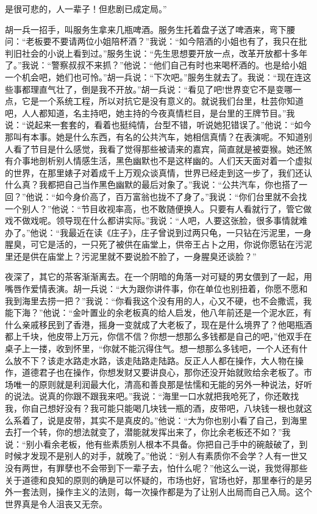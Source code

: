 \documentclass[12pt,oneside]{book}
\begin{document}
是很可悲的，人一辈子！但悲剧已成定局。''

胡一兵一招手，叫服务生拿来几瓶啤酒。服务生托着盘子送了啤酒来，弯下腰问：``老板要不要请两位小姐陪杯酒？''我说：``如今陪酒的小姐也有了，我只在批判旧社会的小说上看到过。''服务生说：``先生思想要开放一点，改革开放都十多年了。''我说：``警察叔叔不来抓？''他说：``他们自己有时也来喝杯酒的。也是给小姐一个机会吧，她们也可怜。''胡一兵说：``下次吧。''服务生就去了。我说：``现在连这些事都理直气壮了，倒是我不开放。''胡一兵说：``看见了吧!世界变它不是变哪一点，它是一个系统工程，所以对抗它是没有意义的。就说我们台里，杜芸你知道吧，人人都知道，名主持吧，她主持的今夜真情栏目，是台里的王牌节目。''我说：``说起来一套套的，看着也挺纯情，台型不错，听说她犯错误了。''他说：``如今那叫有本事。她是什么东西，有名的公共汽车，她相信真情？在表演呢。不知道别人看了节目是什么感觉，我看了觉得那些被请来的嘉宾，简直就是被耍猴。她还煞有介事地剖析别人情感生活，黑色幽默也不是这样幽的。人们天天面对着一个虚拟的世界，在那里婊子对着成千上万观众谈真情，世界已经走到这一步了，我们还认什么真？我都把自己当作黑色幽默的最后对象了。''我说：``公共汽车，你也搭了一回？''他说：``如今身价高了，百万富翁也拢不了身了。''我说：``你们台里就不会找一个别人？''他说：``节目收视率高，也不敢随便换人。只要有人看就行了，管它做戏不做戏呢。领导现在什么都讲实际。''我说：``人吧，人要这张脸，很多事情就难办了。''他说：``我最近在读《庄子》，庄子曾说到过两只龟，一只钻在污泥里，一身腥臭，可它是活的，一只死了被供在庙堂上，供帝王占卜之用，你说你愿钻在污泥里还是供在庙堂上？污泥里就不要说脸不脸了，一身腥臭还谈脸？''

夜深了，其它的茶客渐渐离去。在一个阴暗的角落一对可疑的男女偎到了一起，用嘴唇作爱情表演。胡一兵说：``大为跟你讲件事，你在单位也别扭着，你愿不愿和我到海里去捞一把？''我说：``你看我这个没有用的人，心又不硬，也不会撒谎，我能下海？''他说：``金叶置业的余老板真的给人启发，他八年前还是一个泥水匠，有什么亲戚移民到了香港，摇身一变就成了大老板了，现在是什么境界了？他喝瓶酒都上千块，他皮带上万元，你信不信？你想一想那么多钱都是自己的吧，''他双手在桌子上一搂，收到怀里，``你就不能沉得住气。想一想那么多钱吧，一个人还有什么放不下？该走水路走水路，该走陆路走陆路。反正人人都在操作，大人物在操作，道德君子也在操作，你想发财又要讲良心，那你还没开始就败给余老板了。市场唯一的原则就是利润最大化，清高和善良那是怯懦和无能的另外一种说法，好听的说法。说真的你跟不跟我来吧。''我说：``海里一口水就把我呛死了，你还敢找我，你自己想好没有？我可能只能喝几块钱一瓶的酒，皮带吧，八块钱一根也就这么系着了，说是皮带，其实不是真皮的。''他说：``大为你也别小看了自己，到海里去打一个转，你的想法就变了，潜能就发挥出来了，你比余老板还不如？''我说：``别小看余老板，他有些素质别人根本不具备。你把自己手中的碗敲破了，到时候才发现不是别人的对手，就晚了。''他说：``别人有素质你不会学？人有一世又没有两世，有罪孽也不会带到下一辈子去，怕什么呢？''他这么一说，我觉得那些关于道德和良知的原则的确是可以怀疑的，市场也好，官场也好，那里奉行的是另外一套法则，操作主义的法则，每一次操作都是为了让别人出局而自己入局。这个世界真是令人沮丧又无奈。
\end{document}
